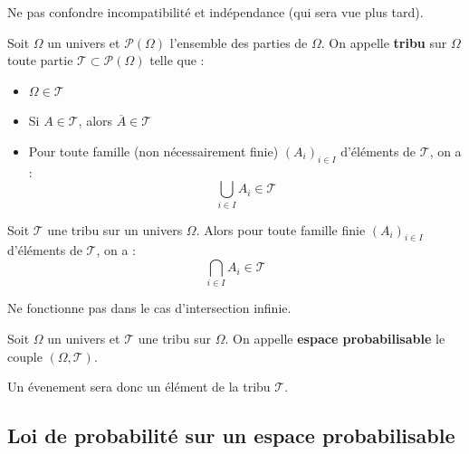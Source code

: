\documentclass[a4paper, 12pt]{article}
\begin{document}
\begin{remarque}
    Ne pas confondre incompatibilité et indépendance (qui sera vue plus tard).
\end{remarque}

\begin{definition}
    Soit $\Omega$ un univers et $\mathcal{P}(\Omega)$ l'ensemble des parties de $\Omega$.
    On appelle \textbf{tribu} sur $\Omega$ toute partie $\mathcal{T} \subset \mathcal{P}(\Omega)$ telle que :
    \begin{itemize}[label=--]
        \item $\Omega \in \mathcal{T}$
        \item Si $A \in \mathcal{T}$, alors $\overline{A} \in \mathcal{T}$
        \item Pour toute famille (non nécessairement finie) $(A_i)_{i \in I}$ d'éléments de $\mathcal{T}$, on a :
        $$
        \bigcup_{i \in I} A_i \in \mathcal{T}
        $$
    \end{itemize}
\end{definition}

\begin{proposition}{}{}
    Soit $\mathcal{T}$ une tribu sur un univers $\Omega$.
    Alors pour toute famille finie $(A_i)_{i \in I}$ d'éléments de $\mathcal{T}$, on a :
    $$
    \bigcap_{i \in I} A_i \in \mathcal{T}
    $$
\end{proposition}

\begin{remarque}
    Ne fonctionne pas dans le cas d'intersection infinie.
\end{remarque}

\begin{definition}
    Soit $\Omega$ un univers et $\mathcal{T}$ une tribu sur $\Omega$.
    On appelle \textbf{espace probabilisable} le couple $(\Omega, \mathcal{T})$.
\end{definition}

\begin{remarque}
    Un évenement sera donc un élément de la tribu $\mathcal{T}$.
\end{remarque}

\subsection{Loi de probabilité sur un espace probabilisable}
\end{document}
